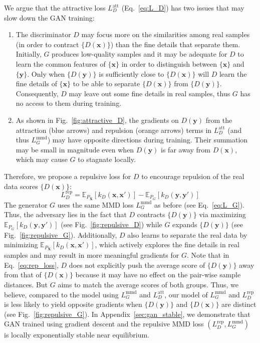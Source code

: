 \documentclass{article} %
\theoremstyle{plain}
\newtheorem*{proposition 1*}{Proposition 1}
\newcommand{\set}[1]{\mathbb{#1}}  %
\newcommand{\rdv}[1]{\mathbf{#1}}  %
\begin{document}
We argue that the attractive loss \(L_D^{\text{att}}\) (Eq.~\ref{eq:L_D}) has two issues that may slow down the GAN training:
\begin{enumerate}[leftmargin=*]
	\item The discriminator \(D\) may focus more on the similarities among real samples (in order to contract \(\{D(\bm{x})\}\)) than the fine details that separate them. Initially, \(G\) produces low-quality samples and it may be adequate for \(D\) to learn the common features of \(\{\bm{x}\}\) in order to distinguish between \(\{\bm{x}\}\) and \(\{\bm{y}\}\). Only when \(\{D(\bm{y})\}\) is sufficiently close to \(\{D(\bm{x})\}\) will \(D\) learn the fine details of \(\{\bm{x}\}\) to be able to separate \(\{D(\bm{x})\}\) from \(\{D(\bm{y})\}\). Consequently, \(D\) may leave out some fine details in real samples, thus \(G\) has no access to them during training.
	\item As shown in Fig.~\ref{fig:attractive_D}, the gradients on \(D(\bm{y})\) from the attraction (blue arrows) and repulsion (orange arrows) terms in \(L_D^{\text{att}}\) (and thus \(L_{G}^{\text{mmd}}\)) may have opposite directions during training. Their summation may be small in magnitude even when \(D(\bm{y})\) is far away from \(D(\bm{x})\), which may cause \(G\) to stagnate locally.
\end{enumerate}

Therefore, we propose a repulsive loss for \(D\) to encourage repulsion of the real data scores \(\{D(\bm{x})\}\):
\begin{equation}\label{eq:rep_loss}
L_{D}^{\text{rep}}=\set{E}_{P_{\rdv{X}}}[k_D(\bm{x},\bm{x}')]-\set{E}_{P_G}[k_D(\bm{y},\bm{y}')]
\end{equation}
The generator \(G\) uses the same MMD loss \(L_{G}^{\text{mmd}}\) as before (see Eq.~\ref{eq:L_G}). Thus, the adversary lies in the fact that \(D\) contracts \(\{D(\bm{y})\}\) via maximizing \(\set{E}_{P_G}[k_D(\bm{y},\bm{y}')]\) (see Fig.~\ref{fig:repulsive_D}) while \(G\) expands \(\{D(\bm{y})\}\) (see Fig.~\ref{fig:repulsive_G}). Additionally, \(D\) also learns to separate the real data by minimizing \(\set{E}_{P_{\rdv{X}}}[k_D(\bm{x},\bm{x}')]\), which actively explores the fine details in real samples and may result in more meaningful gradients for \(G\). Note that in Eq.~\ref{eq:rep_loss}, \(D\) does not explicitly push the average score of \(\{D(\bm{y})\}\) away from that of \(\{D(\bm{x})\}\) because it may have no effect on the pair-wise sample distances. But \(G\) aims to match the average scores of both groups. Thus, we believe, compared to the model using \(L_{G}^{\text{mmd}}\) and \(L_D^{\text{att}}\), our model of \(L_{G}^{\text{mmd}}\) and \(L_{D}^{\text{rep}}\) is less likely to yield opposite gradients when \(\{D(\bm{y})\}\) and \(\{D(\bm{x})\}\) are distinct (see Fig.~\ref{fig:repulsive_G}). In Appendix~\ref{sec:gan_stable}, we demonstrate that GAN trained using gradient descent and the repulsive MMD loss \((L_{D}^{\text{rep}},L_{G}^{\text{mmd}})\) is locally exponentially stable near equilibrium.
\end{document}
